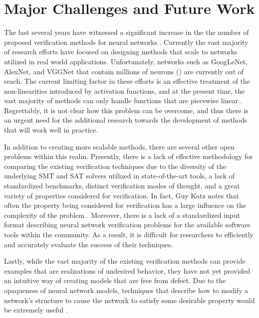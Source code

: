 \documentclass[10pt,conference]{IEEEtran}
\begin{document}
\section{Major Challenges and Future Work \label{sec: Challenges}}
The last several years have witnessed a significant increase in the the number of proposed verification methods for neural networks \cite{XiangVerification2018}. Currently the vast majority of research efforts have focused on designing methods that scale to networks utilized in real world applications. Unfortunately, networks such as GoogLeNet, AlexNet, and VGGNet that contain millions of neurons (\cite{BallesterGoogLeNet,SimonyanVeryDeep}) are currently out of reach. The current limiting factor in these efforts is an effective treatment of the non-linearities introduced by activation functions, and at the present time, the vast majority of methods can only handle functions that are piecewise linear \cite{KuperScalableVerification2018}. Regrettably, it is not clear how this problem can be overcome, and thus there is an urgent need for the additional research towards the development of methods that will work well in practice. 

In addition to creating more scalable methods, there are several other open problems within this realm. Presently, there is a lack of effective methodology for comparing the existing verification techniques due to the diversity of the underlying SMT and SAT solvers utilized in state-of-the-art tools, a lack of standardized benchmarks, distinct verification modes of thought, and a great variety of properties considered for verification. In fact, Guy Katz notes that often the property being considered for verification has a large influence on the complexity of the problem \cite{KatzReluplex2017}. Moreover, there is a lack of a standardized input format describing neural network verification problems for the available software tools within the community. As a result, it is difficult for researchers to efficiently and accurately evaluate the success of their techniques.

Lastly, while the vast majority of the existing verification methods can provide examples that are realizations of undesired behavior, they have not yet provided an intuitive way of creating models that are free from defect. Due to the opaqueness of neural network models, techniques that describe how to modify a network's structure to cause the network to satisfy some desirable property would be extremely useful \cite{KatzReluplex2017}.
\end{document}
